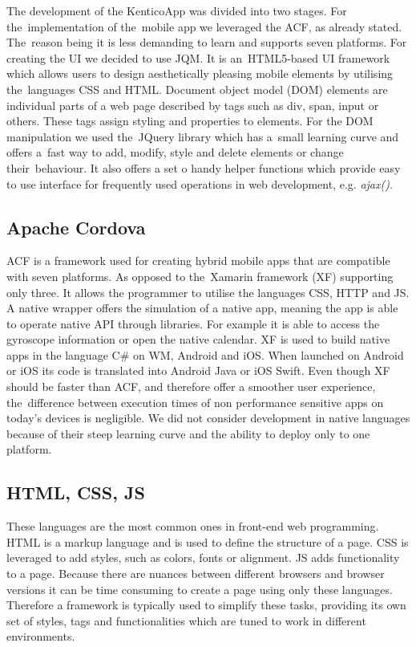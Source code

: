 The development of the KenticoApp was divided into two stages. For the~implementation of the~mobile app we leveraged the ACF, as already stated. The~reason being it is less demanding to learn and supports seven platforms. For creating the UI  we decided to use JQM. It is an~HTML5-based UI framework which allows users to design aesthetically pleasing mobile elements by utilising the~languages CSS and HTML. Document object model (DOM) elements are individual parts of a web page described by tags such as div, span, input or others. These tags assign styling and properties to elements. For the DOM manipulation we used the~JQuery library which has a~small learning curve and offers a~fast way to add, modify, style and delete elements or change their~behaviour. It also offers a set o handy helper functions which provide easy to use interface for frequently used operations in web development, e.g. \textit{ajax()}.

\subsection{Apache Cordova}
ACF is a framework used for creating hybrid mobile apps that are compatible with seven platforms. As opposed to the~Xamarin framework (XF) supporting only three. It allows the programmer to utilise the languages CSS, HTTP and JS. A native wrapper offers the simulation of a native app, meaning the app is able to operate native API through libraries. For example it is able to access the gyroscope information or open the native calendar. XF is used to build native apps in the language C\# on WM, Android and iOS. When launched on Android or iOS its code is translated into Android Java or iOS Swift. Even though XF should be faster than ACF, and therefore offer a smoother user experience, the~difference between execution times of non performance sensitive apps on today's devices is negligible. We did not consider development in native languages because of their steep learning curve and the ability to deploy only to one platform.
\subsection{HTML, CSS, JS}
These languages are the most common ones in front-end web programming. HTML is a markup language and is used to define the structure of a page. CSS is leveraged to add styles, such as colors, fonts or alignment. JS adds functionality to a page. Because there are nuances between different browsers and browser versions it can be time consuming to create a page using only these languages. Therefore a framework is typically used to simplify these tasks, providing its own set of styles, tags and functionalities which are tuned to work in different environments.

